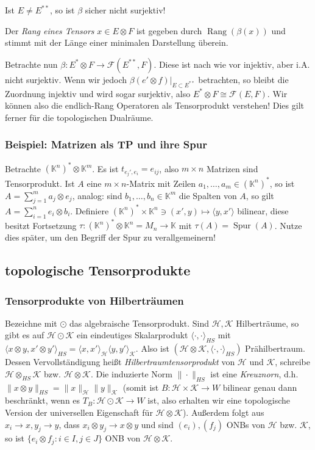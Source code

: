 \documentclass[11pt,a4paper]{scrartcl}
\newcommand{\K}{\mathbb{K}} %
\newcommand{\Hc}{\mathcal{H}}
\newcommand{\Kc}{\mathcal{K}}
\newcommand{\F}{\mathcal{F}}
\theoremstyle{plain}
\theoremstyle{definition}
\theoremstyle{remark}
\DeclareMathOperator{\Rang}{Rang}
\DeclareMathOperator{\Spur}{Spur}
\begin{document}
Ist $E\neq E^{**}$, so ist $\beta$ sicher nicht surjektiv!

Der \emph{Rang eines Tensors} $x\in E\otimes F$ ist gegeben durch $\Rang(\beta(x))$ und stimmt mit der Länge einer minimalen Darstellung überein.

Betrachte nun $\beta: E^*\otimes F \to \F(E^{**},F)$. Diese ist nach wie vor injektiv, aber i.A. nicht surjektiv. Wenn wir jedoch $\beta(e'\otimes f)|_{E\subset E^{**}}$ betrachten, so bleibt die Zuordnung injektiv und wird sogar surjektiv, also $E^*\otimes F \cong \F(E,F)$. Wir können also die endlich-Rang Operatoren als Tensorprodukt verstehen! Dies gilt ferner für die topologischen Dualräume.

\subsubsection{Beispiel: Matrizen als TP und ihre Spur}

Betrachte $(\K^n)^* \otimes \K^m$. Es ist $t_{e_j',e_i}=e_{ij}$, also $m\times n$ Matrizen sind Tensorprodukt. Ist $A$ eine $m\times n$-Matrix mit Zeilen $a_1,\dots,a_m \in (\K^n)^*$, so ist $A=\sum_{j=1}^m a_j \otimes e_j$, analog: sind $b_1,\dots,b_n \in \K^m$ die Spalten von $A$, so gilt $A=\sum_{i=1}^n e_i \otimes b_i$. Definiere $(\K^n)^* \times \K^n \ni (x',y)\mapsto \langle y, x' \rangle$ bilinear, diese besitzt Fortsetzung $\tau: (\K^n)^*\otimes \K^n = M_n \to \K$ mit $\tau(A)=\Spur(A)$. Nutze dies später, um den Begriff der Spur zu verallgemeinern!

\subsection{topologische Tensorprodukte}

\subsubsection{Tensorprodukte von Hilberträumen}

Bezeichne mit $\odot$ das algebraische Tensorprodukt. Sind $\Hc,\Kc$ Hilberträume, so gibt es auf $\Hc\odot \Kc$ ein eindeutiges Skalarprodukt $\langle \cdot, \cdot \rangle_{HS}$ mit $\langle x\otimes y, x'\otimes y' \rangle_{HS} = \langle x,x' \rangle_\Hc \langle y, y' \rangle_\Kc$. Also ist $(\Hc\otimes \Kc, \langle \cdot, \cdot \rangle_{HS})$ Prähilbertraum. Dessen Vervollständigung heißt \emph{Hilbertraumtensorprodukt} von $\Hc$ und $\Kc$, schreibe $\Hc \otimes_{HS} \Kc$ bzw. $\Hc \otimes \Kc$. Die induzierte Norm $\|\cdot\|_{HS}$ ist eine \emph{Kreuznorn}, d.h. $\|x\otimes y\|_{HS}=\|x\|_\Hc \|y\|_\Kc$ (somit ist $B: \Hc \times \Kc \to W$ bilinear genau dann beschränkt, wenn es $T_B: \Hc \odot \Kc \to W$ ist, also erhalten wir eine topologische Version der universellen Eigenschaft für $\Hc \otimes \Kc$). Außerdem folgt aus $x_i \to x, y_j\to y$, dass $x_i \otimes y_j \to x\otimes y$ und sind $(e_i), (f_j)$ ONBs von $\Hc$ bzw. $\Kc$, so ist $\{ e_i \otimes f_j: i\in I, j\in J \}$ ONB von $\Hc\otimes \Kc$.
\end{document}
